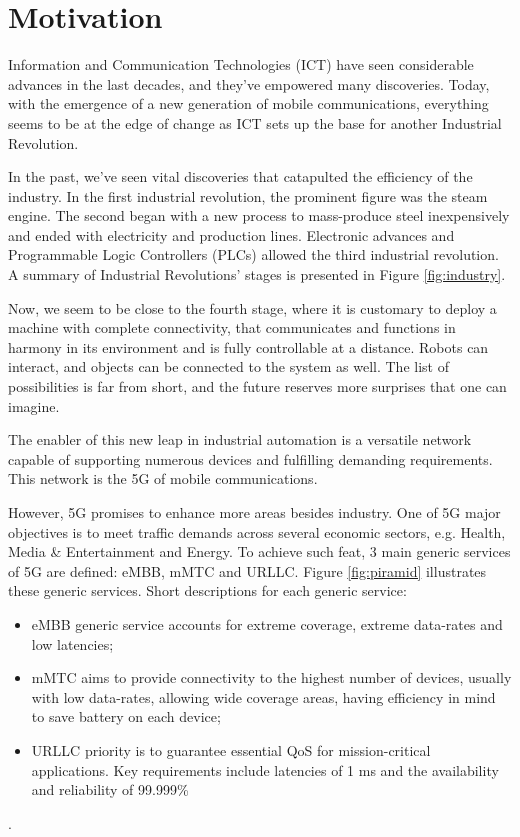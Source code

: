\section{Motivation}
\label{sec:int_motivation}

Information and Communication Technologies (ICT) have seen considerable advances in the last decades, and they've empowered many discoveries. Today, with the emergence of a new generation of mobile communications, everything seems to be at the edge of change as ICT sets up the base for another Industrial Revolution.

In the past, we've seen vital discoveries that catapulted the efficiency of the industry. In the first industrial revolution, the prominent figure was the steam engine. The second began with a new process to mass-produce steel inexpensively and ended with electricity and production lines. Electronic advances and Programmable Logic Controllers (PLCs) allowed the third industrial revolution. A summary of Industrial Revolutions' stages is presented in Figure \ref{fig:industry}. 


Now, we seem to be close to the fourth stage, where it is customary to deploy a machine with complete connectivity, that communicates and functions in harmony in its environment and is fully controllable at a distance. Robots can interact, and objects can be connected to the system as well. The list of possibilities is far from short, and the future reserves more surprises that one can imagine.

The enabler of this new leap in industrial automation is a versatile network capable of supporting numerous devices and fulfilling demanding requirements. This network is the \ac{5G} of mobile communications.

However, \ac{5G} promises to enhance more areas besides industry. One of \ac{5G} major objectives is to meet traffic demands across several economic sectors, e.g. Health, Media \& Entertainment and Energy. To achieve such feat, 3 main generic services of 5G are defined: \ac{eMBB}, \ac{mMTC} and \ac{URLLC}. Figure \ref{fig:piramid} illustrates these generic services. Short descriptions for each generic service:
\begin{itemize}
 \item \ac{eMBB} generic service accounts for extreme coverage, extreme data-rates and low latencies;
 \item \ac{mMTC} aims to provide connectivity to the highest number of devices, usually with low data-rates, allowing wide coverage areas, having efficiency in mind to save battery on each device;
 \item \ac{URLLC} priority is to guarantee essential \ac{QoS} for mission-critical applications. Key requirements include latencies of 1 ms and the availability and reliability of 99.999\%
\end{itemize}.



